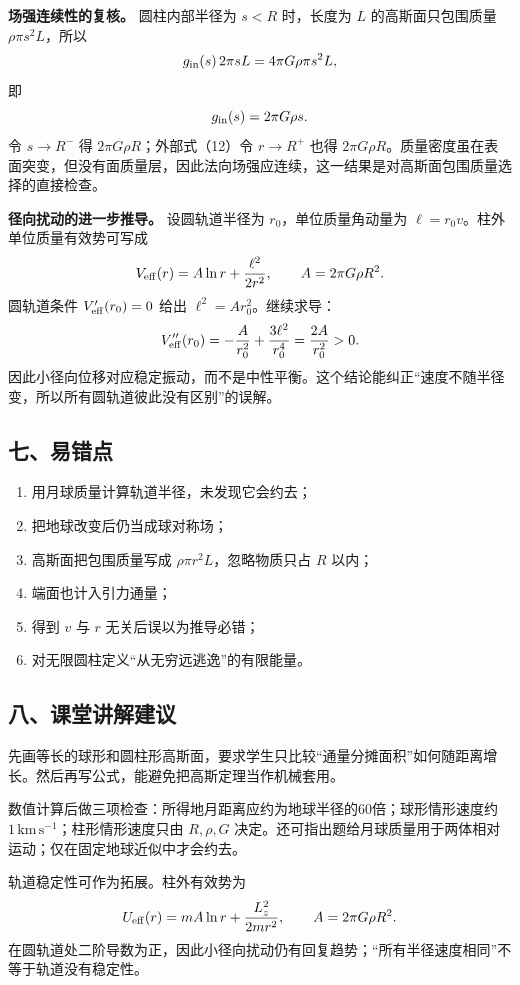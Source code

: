 \documentclass[12pt,a4paper,UTF8]{ctexart}
\newcommand{\tightlist}{\setlength{\itemsep}{0pt}\setlength{\parskip}{0pt}}
\begin{document}
\textbf{场强连续性的复核。} 圆柱内部半径为 \(s<R\) 时，长度为 \(L\)
的高斯面只包围质量 \(\rho\pi s^2L\)，所以 \[
g_{\rm in}(s)\,2\pi sL
=4\pi G\rho\pi s^2L,
\] 即 \[
g_{\rm in}(s)=2\pi G\rho s.
\] 令 \(s\to R^-\) 得 \(2\pi G\rho R\)；外部式（12）令 \(r\to R^+\) 也得
\(2\pi G\rho R\)。质量密度虽在表面突变，但没有面质量层，因此法向场强应连续，这一结果是对高斯面包围质量选择的直接检查。

\textbf{径向扰动的进一步推导。} 设圆轨道半径为 \(r_0\)，单位质量角动量为
\(\ell=r_0v\)。柱外单位质量有效势可写成 \[
V_{\rm eff}(r)=A\ln r+\frac{\ell^2}{2r^2},
\qquad A=2\pi G\rho R^2.
\] 圆轨道条件 \(V'_{\rm eff}(r_0)=0\) 给出 \(\ell^2=Ar_0^2\)。继续求导：
\[
V''_{\rm eff}(r_0)
=-\frac{A}{r_0^2}+\frac{3\ell^2}{r_0^4}
=\frac{2A}{r_0^2}>0.
\]
因此小径向位移对应稳定振动，而不是中性平衡。这个结论能纠正``速度不随半径变，所以所有圆轨道彼此没有区别''的误解。

\subsection{七、易错点}\label{ux4e03ux6613ux9519ux70b9}

\begin{enumerate}
\def\labelenumi{\arabic{enumi}.}
\tightlist
\item
  用月球质量计算轨道半径，未发现它会约去；
\item
  把地球改变后仍当成球对称场；
\item
  高斯面把包围质量写成 \(\rho\pi r^2L\)，忽略物质只占 \(R\) 以内；
\item
  端面也计入引力通量；
\item
  得到 \(v\) 与 \(r\) 无关后误以为推导必错；
\item
  对无限圆柱定义``从无穷远逃逸''的有限能量。
\end{enumerate}

\subsection{八、课堂讲解建议}\label{ux516bux8bfeux5802ux8bb2ux89e3ux5efaux8bae}

先画等长的球形和圆柱形高斯面，要求学生只比较``通量分摊面积''如何随距离增长。然后再写公式，能避免把高斯定理当作机械套用。

数值计算后做三项检查：所得地月距离应约为地球半径的60倍；球形情形速度约
\(1\,\mathrm{km\,s^{-1}}\)；柱形情形速度只由 \(R,\rho,G\)
决定。还可指出题给月球质量用于两体相对运动；仅在固定地球近似中才会约去。

轨道稳定性可作为拓展。柱外有效势为 \[
U_{\rm eff}(r)=mA\ln r+\frac{L_z^2}{2mr^2},
\qquad A=2\pi G\rho R^2.
\]
在圆轨道处二阶导数为正，因此小径向扰动仍有回复趋势；``所有半径速度相同''不等于轨道没有稳定性。
\end{document}
